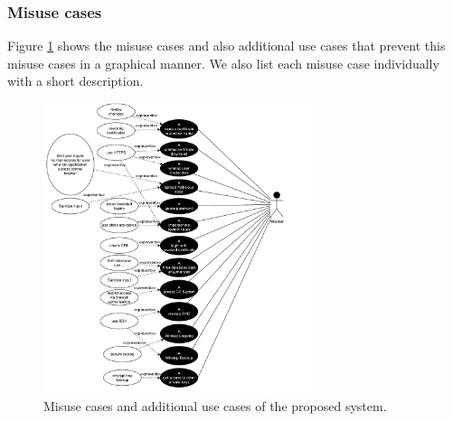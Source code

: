 \documentclass[a4paper, toc=index, 12pt, DIV14, twoside, BCOR2cm, headsepline, numbers=noenddot, bibliography=totoc]{report}
\begin{document}
\subsubsection{Misuse cases}
Figure \ref{misusecase} shows the misuse cases and also additional use cases that prevent this misuse cases in a graphical manner. We also list each misuse case individually with a short description.
\begin{figure}[H]
  \centering
    \includegraphics[width=0.7\textwidth]{images/misusediagram.pdf}  
  \caption{Misuse cases and additional use cases of the proposed system.}
  \label{misusecase}
\end{figure}
\end{document}
